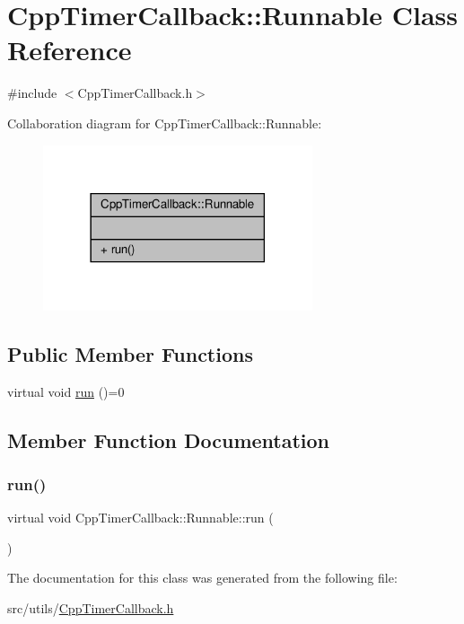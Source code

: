 \hypertarget{classCppTimerCallback_1_1Runnable}{}\section{Cpp\+Timer\+Callback\+:\+:Runnable Class Reference}
\label{classCppTimerCallback_1_1Runnable}


{\ttfamily \#include $<$Cpp\+Timer\+Callback.\+h$>$}



Collaboration diagram for Cpp\+Timer\+Callback\+:\+:Runnable\+:\nopagebreak
\begin{figure}[H]
\begin{center}
\leavevmode
\includegraphics[width=225pt]{classCppTimerCallback_1_1Runnable__coll__graph}
\end{center}
\end{figure}
\subsection*{Public Member Functions}
\begin{DoxyCompactItemize}
\item 
virtual void \hyperlink{classCppTimerCallback_1_1Runnable_af8d11a3b580e76431151e76ac1886e6e}{run} ()=0
\end{DoxyCompactItemize}


\subsection{Member Function Documentation}
\mbox{\label{classCppTimerCallback_1_1Runnable_af8d11a3b580e76431151e76ac1886e6e}} 
\subsubsection{\texorpdfstring{run()}{run()}}
{\footnotesize\ttfamily virtual void Cpp\+Timer\+Callback\+::\+Runnable\+::run (\begin{DoxyParamCaption}{ }\end{DoxyParamCaption})\hspace{0.3cm}{\ttfamily [pure virtual]}}



The documentation for this class was generated from the following file\+:\begin{DoxyCompactItemize}
\item 
src/utils/\hyperlink{CppTimerCallback_8h}{Cpp\+Timer\+Callback.\+h}\end{DoxyCompactItemize}
